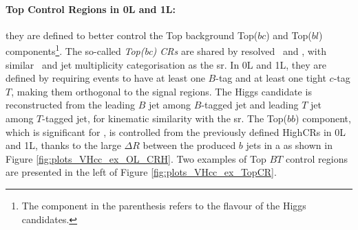 \paragraph{Top Control Regions in 0L and 1L:} they are defined to better control the Top background Top($bc$) and Top($bl$) components\footnote{The component in the parenthesis refers to the flavour of the Higgs candidates.}. The so-called \textit{Top(bc) CRs} are shared by resolved \vhb\ and \vhc, with similar \ptv\ and jet multiplicity categorisation as the \gls{sr}. In 0L and 1L, they are defined by requiring events to have at least one $B$-tag and at least one tight $c$-tag $T$, making them orthogonal to the signal regions. The Higgs candidate is reconstructed from the leading $B$ jet among $B$-tagged jet and leading $T$ jet among $T$-tagged jet, for kinematic similarity with the \gls{sr}. The Top($bb$) component, which is significant for \vhb, is controlled from the previously defined HighCRs in 0L and 1L, thanks to the large $\Delta R$ between the produced $b$ jets in a \ttb as shown in Figure \ref{fig:plots_VHcc_ex_OL_CRH}. Two examples of Top $BT$ control regions are presented in the left of Figure \ref{fig:plots_VHcc_ex_TopCR}.

